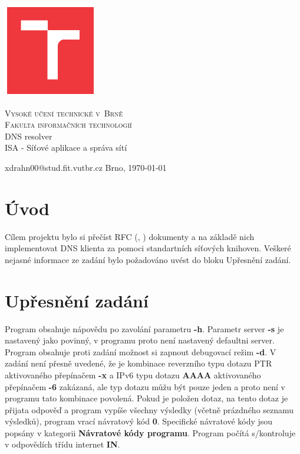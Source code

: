 \documentclass[a4paper,11pt]{article}
\begin{document}
\begin{titlepage}

	\begin{center}

        \includegraphics[width=4.1cm,keepaspectratio,trim={1.2cm 1.2cm 1.2cm 1.2cm},clip]{./template-fig/VUT_symbol_barevne_CMYK_CZ}%

		{\Huge\textsc{Vysoké učení technické v~Brně}}\\
		\medskip
		{\huge\textsc{Fakulta informačních technologií}}\\
		{\huge DNS resolver}\\
		\medskip
		{\LARGE ISA - Síťové aplikace a správa sítí}\\
	\end{center}

    \noindent xdrahn00@stud.fit.vutbr.cz \Large {\hfill Brno, \today}

\end{titlepage}

\section{Úvod}

Cílem projektu bylo si přečíst RFC (\cite{rfc10135}, \cite{rfc13596}) dokumenty a na základě nich implementovat DNS klienta za pomoci standartních síťových knihoven. Veškeré nejasné informace ze zadání bylo požadováno uvést do bloku Upřesnění zadání.

\section{Upřesnění zadání}

Program obsahuje nápovědu po zavolání parametru \textbf{-h}. Parametr server \textbf{-s} je nastavený jako povinný, v programu proto není nastavený defaultni server. Program obsahuje proti zadání možnost si zapnout debugovací režim \textbf{-d}. V zadání není přesně uvedené, že je kombinace reverzního typu dotazu PTR aktivovaného přepínačem \textbf{-x} a IPv6 typu dotazu \textbf{AAAA} aktivovaného přepínačem \textbf{-6} zakázaná, ale typ dotazu můžu být pouze jeden a proto není v programu tato kombinace povolená. Pokud je položen dotaz, na tento dotaz je přijata odpověď a program vypíše všechny výsledky (včetně prázdného seznamu výsledků), program vrací návratový kód \textbf{0}. Specifické návratové kódy jsou popsány v kategorii \textbf{Návratové kódy programu}. Program počítá s/kontroluje v odpovědích třídu internet \textbf{IN}.
\end{document}
